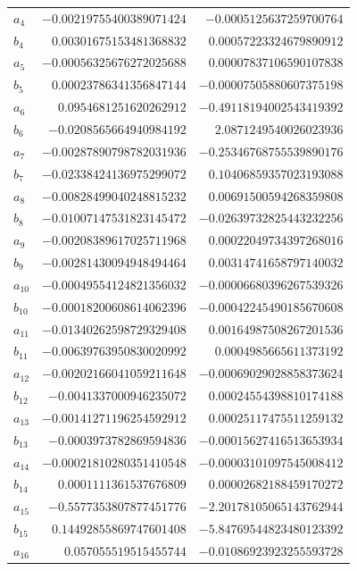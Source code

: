 \documentclass[11pt]{article}
\theoremstyle{definition}
\begin{document}
{\begin{longtable}{lrr}
$a_{4}$ & $-0.00219755400389071424$ & $-0.0005125637259700764$\\
$b_{4}$ & $0.00301675153481368832$ & $0.00057223324679890912$\\
$a_{5}$ & $-0.00056325676272025688$ & $0.00007837106590107838$\\
$b_{5}$ & $0.00023786341356847144$ & $-0.00007505880607375198$\\
$a_{6}$ & $0.0954681251620262912$ & $-0.49118194002543419392$\\
$b_{6}$ & $-0.0208565664940984192$ & $2.0871249540026023936$\\
$a_{7}$ & $-0.00287890798782031936$ & $-0.25346768755539890176$\\
$b_{7}$ & $-0.02338424136975299072$ & $0.10406859357023193088$\\
$a_{8}$ & $-0.00828499040248815232$ & $0.00691500594268359808$\\
$b_{8}$ & $-0.01007147531823145472$ & $-0.02639732825443232256$\\
$a_{9}$ & $-0.00208389617025711968$ & $0.00022049734397268016$\\
$b_{9}$ & $-0.00281430094948494464$ & $0.00314741658797140032$\\
$a_{10}$ & $-0.00049554124821356032$ & $-0.00006680396267539326$\\
$b_{10}$ & $-0.00018200608614062396$ & $-0.00042245490185670608$\\
$a_{11}$ & $-0.01340262598729329408$ & $0.00164987508267201536$\\
$b_{11}$ & $-0.00639763950830020992$ & $0.0004985665611373192$\\
$a_{12}$ & $-0.00202166041059211648$ & $-0.00069029028858373624$\\
$b_{12}$ & $-0.0041337000946235072$ & $0.00024554398810174188$\\
$a_{13}$ & $-0.00141271196254592912$ & $0.00025117475511259132$\\
$b_{13}$ & $-0.0003973782869594836$ & $-0.00015627416513653934$\\
$a_{14}$ & $-0.00021810280351410548$ & $-0.00003101097545008412$\\
$b_{14}$ & $0.0001111361537676809$ & $0.00002682188459170272$\\
$a_{15}$ & $-0.5577353807877451776$ & $-2.20178105065143762944$\\
$b_{15}$ & $0.14492855869747601408$ & $-5.84769544823480123392$\\
$a_{16}$ & $0.057055519515455744$ & $-0.01086923923255593728$\\

\end{longtable}}
\end{document}
